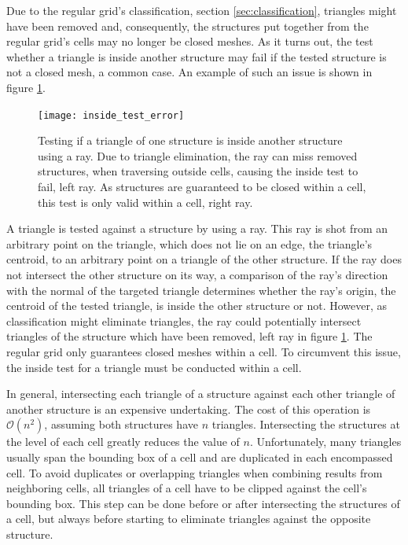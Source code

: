 Due to the regular grid's classification, \cf section \ref{sec:classification}, triangles might have been removed and, consequently, the structures put together from the regular grid's cells may no longer be closed meshes.
As it turns out, the test whether a triangle is inside another structure may fail if the tested structure is not a closed mesh, a common case.
An example of such an issue is shown in figure \ref{fig:inside_test_error}.
%
\begin{figure}
	\centering
	\texttt{[image: inside\_test\_error]}
	\caption{
		Testing if a triangle of one structure is inside another structure using a ray.
		Due to triangle elimination, the ray can miss removed structures, \eg when traversing outside cells, causing the inside test to fail, \cf left ray.
		As structures are guaranteed to be closed within a cell, this test is only valid within a cell, \cf right ray.
	}
	\label{fig:inside_test_error}
\end{figure}
%
A triangle is tested against a structure by using a ray.
This ray is shot from an arbitrary point on the triangle, which does not lie on an edge, \eg the triangle's centroid, to an arbitrary point on a triangle of the other structure.
If the ray does not intersect the other structure on its way, a comparison of the ray's direction with the normal of the targeted triangle determines whether the ray's origin, \ie the centroid of the tested triangle, is inside the other structure or not.
However, as classification might eliminate triangles, the ray could potentially intersect triangles of the structure which have been removed, \cf left ray in figure \ref{fig:inside_test_error}.
The regular grid only guarantees closed meshes within a cell.
To circumvent this issue, the inside test for a triangle must be conducted within a cell.

In general, intersecting each triangle of a structure against each other triangle of another structure is an expensive undertaking.
The cost of this operation is $\mathcal{O}(n^2)$, assuming both structures have $n$ triangles.
Intersecting the structures at the level of each cell greatly reduces the value of $n$.
Unfortunately, many triangles usually span the bounding box of a cell and are duplicated in each encompassed cell.
To avoid duplicates or overlapping triangles when combining results from neighboring cells, all triangles of a cell have to be clipped against the cell's bounding box.
This step can be done before or after intersecting the structures of a cell, but always before starting to eliminate triangles against the opposite structure.

